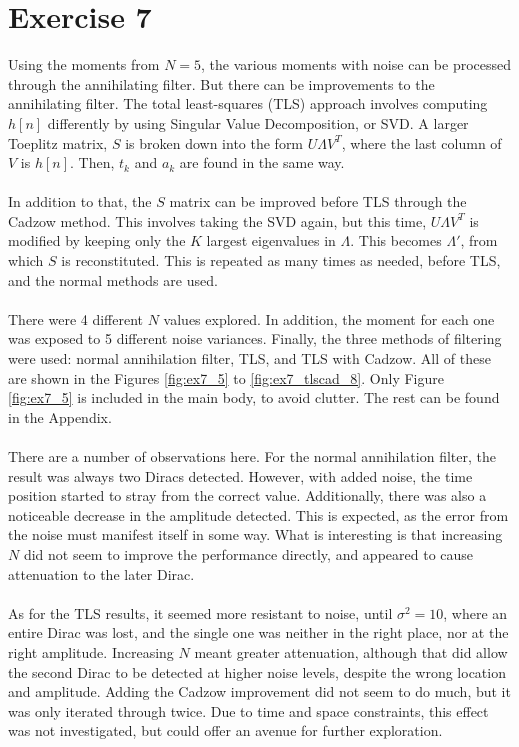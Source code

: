 \documentclass[11pt,a4paper]{report}
\newcommand{\mychapter}[2]
{
    \setcounter{chapter}{#1}
    \setcounter{section}{0}
    \chapter*{#2}
    \addcontentsline{toc}{chapter}{#2}
}
\begin{document}
\mychapter{7}{Exercise 7}
Using the moments from $N = 5$, the various moments with noise can be processed through the annihilating filter. But there can be improvements to the annihilating filter. The total least-squares (TLS) approach involves computing $h[n]$ differently by using Singular Value Decomposition, or SVD. A larger Toeplitz matrix, $S$ is broken down into the form $U\Lambda V^T$, where the last column of $V$ is $h[n]$. Then, $t_k$ and $a_k$ are found in the same way.
\\\\
In addition to that, the $S$ matrix can be improved before TLS through the Cadzow method. This involves taking the SVD again, but this time, $U\Lambda V^T$ is modified by keeping only the $K$ largest eigenvalues in $\Lambda$. This becomes $\Lambda'$, from which $S$ is reconstituted. This is repeated as many times as needed, before TLS, and the normal methods are used.
\\\\
There were 4 different $N$ values explored. In addition, the moment for each one was exposed to 5 different noise variances. Finally, the three methods of filtering were used: normal annihilation filter, TLS, and TLS with Cadzow. All of these are shown in the Figures \ref{fig:ex7_5} to \ref{fig:ex7_tlscad_8}. Only Figure \ref{fig:ex7_5} is included in the main body, to avoid clutter. The rest can be found in the Appendix.
\\\\
There are a number of observations here. For the normal annihilation filter, the result was always two Diracs detected. However, with added noise, the time position started to stray from the correct value. Additionally, there was also a noticeable decrease in the amplitude detected. This is expected, as the error from the noise must manifest itself in some way. What is interesting is that increasing $N$ did not seem to improve the performance directly, and appeared to cause attenuation to the later Dirac.
\\\\
As for the TLS results, it seemed more resistant to noise, until $\sigma^2 = 10$, where an entire Dirac was lost, and the single one was neither in the right place, nor at the right amplitude. Increasing $N$ meant greater attenuation, although that did allow the second Dirac to be detected at higher noise levels, despite the wrong location and amplitude. Adding the Cadzow improvement did not seem to do much, but it was only iterated through twice. Due to time and space constraints, this effect was not investigated, but could offer an avenue for further exploration.
\end{document}
